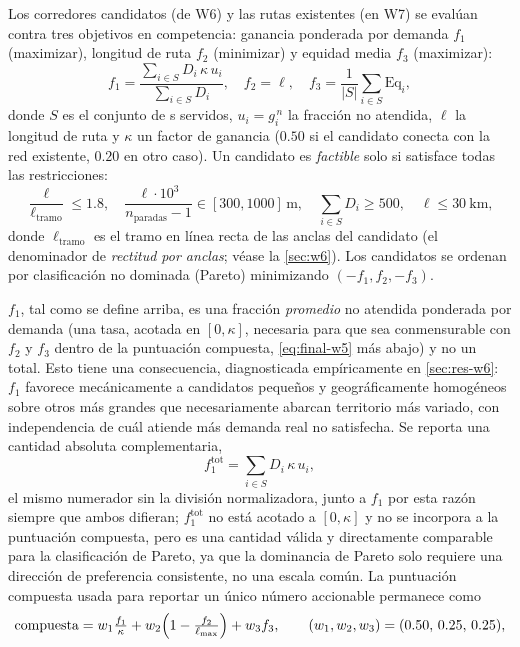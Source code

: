 Los corredores candidatos (de W6) y las rutas existentes (en W7) se evalúan contra
tres objetivos en competencia: ganancia ponderada por demanda $f_1$ (maximizar),
longitud de ruta $f_2$ (minimizar) y equidad media $f_3$ (maximizar):
\begin{equation}
  f_1 = \frac{\sum_{i\in S} D_i\, \kappa\, u_i}{\sum_{i\in S} D_i}, \quad
  f_2 = \ell, \quad
  f_3 = \frac{1}{|S|}\sum_{i\in S}\mathrm{Eq}_i,
  \label{eq:objectives}
\end{equation}
donde $S$ es el conjunto de \ageb{}s servidos, $u_i = g^{\,n}_i$ la fracción no
atendida, $\ell$ la longitud de ruta y $\kappa$ un factor de ganancia ($\num{0.50}$
si el candidato conecta con la red existente, $\num{0.20}$ en otro caso). Un
candidato es \emph{factible} solo si satisface todas las restricciones:
\begin{equation}
  \frac{\ell}{\ell_{\text{tramo}}} \le 1.8, \quad
  \frac{\ell\cdot 10^3}{n_{\text{paradas}}-1} \in [300,1000]\,\si{\metre}, \quad
  \textstyle\sum_{i\in S} D_i \ge 500, \quad \ell \le \SI{30}{\kilo\metre},
  \label{eq:constraints}
\end{equation}
donde $\ell_{\text{tramo}}$ es el tramo en línea recta de las anclas del candidato
(el denominador de \emph{rectitud por anclas}; véase la \cref{sec:w6}). Los
candidatos se ordenan por clasificación no dominada (Pareto) minimizando
$(-f_1, f_2, -f_3)$.

$f_1$, tal como se define arriba, es una fracción \emph{promedio} no atendida ponderada
por demanda (una tasa, acotada en $[0,\kappa]$, necesaria para que sea conmensurable con
$f_2$ y $f_3$ dentro de la puntuación compuesta, \cref{eq:final-w5} más abajo) y no un
total. Esto tiene una consecuencia, diagnosticada empíricamente en \cref{sec:res-w6}:
$f_1$ favorece mecánicamente a candidatos pequeños y geográficamente homogéneos sobre
otros más grandes que necesariamente abarcan territorio más variado, con independencia de
cuál atiende más demanda real no satisfecha. Se reporta una cantidad absoluta
complementaria,
\begin{equation}
  f_1^{\text{tot}} = \sum_{i\in S} D_i\, \kappa\, u_i,
  \label{eq:f1-total}
\end{equation}
el mismo numerador sin la división normalizadora, junto a $f_1$ por esta razón siempre
que ambos difieran; $f_1^{\text{tot}}$ no está acotado a $[0,\kappa]$ y no se incorpora a
la puntuación compuesta, pero es una cantidad válida y directamente comparable para la
clasificación de Pareto, ya que la dominancia de Pareto solo requiere una dirección de
preferencia consistente, no una escala común. La puntuación compuesta usada para
reportar un único número accionable permanece como
\begin{equation}
  \text{compuesta} = w_1 \tfrac{f_1}{\kappa} + w_2\Bigl(1 - \tfrac{f_2}{\ell_{\max}}\Bigr)
    + w_3 f_3, \qquad (w_1,w_2,w_3) = (0.50,\,0.25,\,0.25),
  \label{eq:final-w5}
\end{equation}

